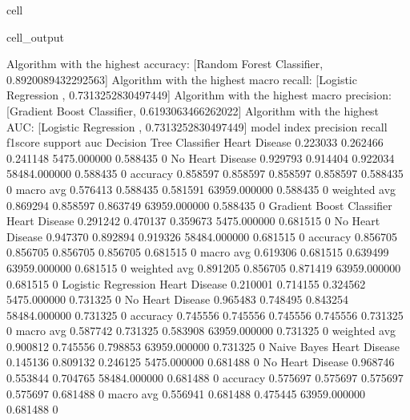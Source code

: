 \documentclass[letterpaper,10pt,english]{jupyterBook}
\begin{document}
\begin{sphinxuseclass}{cell}
\begin{sphinxVerbatimOutput}
\begin{sphinxuseclass}{cell_output}
\begin{sphinxVerbatim}[commandchars=\\\{\}]
Algorithm with the highest accuracy: [\PYGZsq{}Random Forest Classifier\PYGZsq{}, 0.8920089432292563]
Algorithm with the highest macro recall:
        [\PYGZsq{}Logistic Regression \PYGZsq{}, 0.7313252830497449]
Algorithm with the highest macro precision:
        [\PYGZsq{}Gradient Boost Classifier\PYGZsq{}, 0.6193063466262022]
Algorithm with the highest AUC:
        [\PYGZsq{}Logistic Regression \PYGZsq{}, 0.7313252830497449]
model                      index             precision  recall    f1\PYGZhy{}score  support       auc     
Decision Tree Classifier   Heart Disease     0.223033   0.262466  0.241148  5475.000000   0.588435    0
                           No Heart Disease  0.929793   0.914404  0.922034  58484.000000  0.588435    0
                           accuracy          0.858597   0.858597  0.858597  0.858597      0.588435    0
                           macro avg         0.576413   0.588435  0.581591  63959.000000  0.588435    0
                           weighted avg      0.869294   0.858597  0.863749  63959.000000  0.588435    0
Gradient Boost Classifier  Heart Disease     0.291242   0.470137  0.359673  5475.000000   0.681515    0
                           No Heart Disease  0.947370   0.892894  0.919326  58484.000000  0.681515    0
                           accuracy          0.856705   0.856705  0.856705  0.856705      0.681515    0
                           macro avg         0.619306   0.681515  0.639499  63959.000000  0.681515    0
                           weighted avg      0.891205   0.856705  0.871419  63959.000000  0.681515    0
Logistic Regression        Heart Disease     0.210001   0.714155  0.324562  5475.000000   0.731325    0
                           No Heart Disease  0.965483   0.748495  0.843254  58484.000000  0.731325    0
                           accuracy          0.745556   0.745556  0.745556  0.745556      0.731325    0
                           macro avg         0.587742   0.731325  0.583908  63959.000000  0.731325    0
                           weighted avg      0.900812   0.745556  0.798853  63959.000000  0.731325    0
Naive Bayes                Heart Disease     0.145136   0.809132  0.246125  5475.000000   0.681488    0
                           No Heart Disease  0.968746   0.553844  0.704765  58484.000000  0.681488    0
                           accuracy          0.575697   0.575697  0.575697  0.575697      0.681488    0
                           macro avg         0.556941   0.681488  0.475445  63959.000000  0.681488    0

\end{sphinxVerbatim}
\end{sphinxuseclass}
\end{sphinxVerbatimOutput}
\end{sphinxuseclass}
\end{document}
